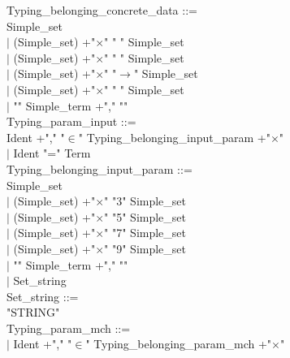 \documentclass[12pt,a4paper,draft]{article}
\begin{document}
{\begin{sloppypar}
Typing\_belonging\_concrete\_data ::= \\ 
\hspace*{0.20in}   Simple\_set\\ 
\hspace*{0.20in} $|$ (Simple\_set) +"$\times$"  " "  Simple\_set  \\ 
\hspace*{0.20in} $|$ (Simple\_set) +"$\times$"   " "  Simple\_set  \\ 
\hspace*{0.20in} $|$ (Simple\_set) +"$\times$"   "$\rightarrow$"  Simple\_set  \\ 
\hspace*{0.20in} $|$ (Simple\_set) +"$\times$"   " "  Simple\_set  \\ 
\hspace*{0.20in} $|$ "{" Simple\_term +","  "}"\\ 
 Typing\_param\_input ::= \\ 
\hspace*{0.20in}  Ident +","   "$\in$"  Typing\_belonging\_input\_param +"$\times$"\\ 
\hspace*{0.20in} $|$ Ident  "="  Term\\ 
Typing\_belonging\_input\_param ::= \\ 
\hspace*{0.20in}   Simple\_set\\ 
\hspace*{0.20in} $|$ (Simple\_set)  +"$\times$"   "3"  Simple\_set  \\ 
\hspace*{0.20in} $|$ (Simple\_set)  +"$\times$"   "5"  Simple\_set\\ 
\hspace*{0.20in} $|$ (Simple\_set)  +"$\times$"   "7"  Simple\_set\\ 
\hspace*{0.20in} $|$ (Simple\_set) +"$\times$"  "9"  Simple\_set\\ 
\hspace*{0.20in} $|$ "{" Simple\_term +","  "}"\\ 
\hspace*{0.20in} $|$ Set\_string\\ 
Set\_string ::= \\ 
\hspace*{0.20in}  "STRING" \\ 
Typing\_param\_mch ::= \\ 
\hspace*{0.20in} $|$ Ident +","   "$\in$"  Typing\_belonging\_param\_mch +"$\times$"\\ 

\end{sloppypar}}
\end{document}
